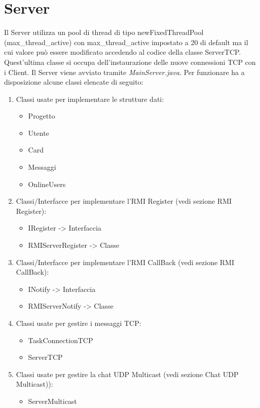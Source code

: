 \documentclass{article} %
\begin{document}
\section{Server}
Il Server utilizza un pool di thread di tipo newFixedThreadPool (max\_thread\_active) con max\_thread\_active impostato a 20 di default ma il cui valore può essere modificato accedendo al codice della classe ServerTCP. Quest'ultima classe si occupa dell'instaurazione delle nuove connessioni TCP con i Client. Il Server viene avviato tramite {\itshape MainServer.java}. Per funzionare ha a disposizione alcune classi elencate di seguito:
\begin{enumerate} 
\item Classi usate per implementare le strutture dati:
	\begin{itemize} 
	\item Progetto
	\item Utente
	\item Card
	\item Messaggi
	\item OnlineUsers
	\end{itemize} 
\item Classi/Interfacce per implementare l'RMI Register (vedi sezione RMI Register):
	\begin{itemize} 
	\item IRegister -> Interfaccia
	\item RMIServerRegister -> Classe
	\end{itemize}
\item Classi/Interfacce per implementare l'RMI CallBack (vedi sezione RMI CallBack):
	\begin{itemize} 
	\item INotify -> Interfaccia
	\item RMIServerNotify -> Classe
	\end{itemize} 
\item Classi usate per gestire i messaggi TCP: 
	\begin{itemize} 
	\item TaskConnectionTCP
	\item ServerTCP
	\end{itemize} 
\item Classi usate per gestire la chat UDP Multicast (vedi sezione Chat UDP Multicast)):
	\begin{itemize} 
	\item ServerMulticast
	\end{itemize} 
\end{enumerate}
\end{document}
